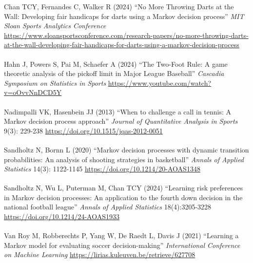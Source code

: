 \documentclass{article}
\begin{document}
    Chan TCY, Fernandes C, Walker R (2024) ``No More Throwing Darts at the Wall: Developing fair handicaps for darts using a Markov decision process'' {\it MIT Sloan Sports Analytics Conference} \url{https://www.sloansportsconference.com/research-papers/no-more-throwing-darts-at-the-wall-developing-fair-handicaps-for-darts-using-a-markov-decision-process}\\
    ~\\
    Hahn J, Powers S, Pai M, Schaefer A (2024) ``The Two-Foot Rule: A game theoretic analysis of the pickoff limit in Major League Baseball'' {\it Cascadia Symposium on Statistics in Sports} \url{https://www.youtube.com/watch?v=oOvvNnDCD5Y}\\
    ~\\
    Nadimpalli VK, Hasenbein JJ (2013) ``When to challenge a call in tennis: A Markov decision process approach'' {\it Journal of Quantitative Analysis in Sports} 9(3): 229-238 \url{https://doi.org/10.1515/jqas-2012-0051}\\
    ~\\
    Sandholtz N, Bornn L (2020) ``Markov decision processes with dynamic transition probabilities: An analysis of shooting strategies in basketball'' {\it Annals of Applied Statistics} 14(3): 1122-1145 \url{https://doi.org/10.1214/20-AOAS1348}\\
    ~\\
    Sandholtz N, Wu L, Puterman M, Chan TCY (2024) ``Learning risk preferences in Markov decision processes: An application to the fourth down decision in the national football league'' {\it Annals of Applied Statistics} 18(4):3205-3228 \url{https://doi.org/10.1214/24-AOAS1933}\\
    ~\\
    Van Roy M, Robberechts P, Yang W, De Raedt L, Davis J (2021) ``Learning a Markov model for evaluating soccer decision-making'' {\it International Conference on Machine Learning} \url{https://lirias.kuleuven.be/retrieve/627708}
\end{document}
